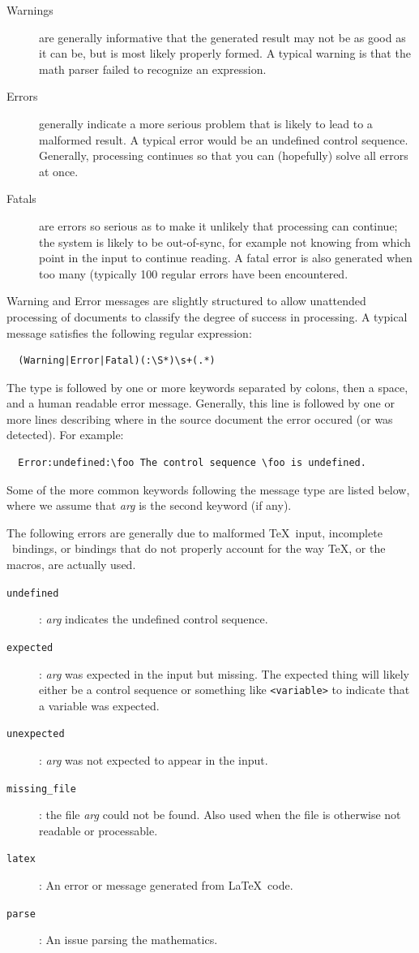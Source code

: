 \documentclass{book}
\begin{document}
\begin{description}
\item[Warnings] are generally
informative that the generated result may not be as good as it can be,
but is most likely properly formed.  A typical warning is that
the math parser failed to recognize an expression.
\item[Errors] generally indicate a more serious problem that is likely
to lead to a malformed result.  A typical error would be an undefined
control sequence.  Generally, processing continues so that you can
(hopefully) solve all errors at once.
\item[Fatals] are errors so serious as to make it unlikely that processing
can continue; the system is likely to be out-of-sync, for example
not knowing from which  point in the input to continue reading.
A fatal error is also generated when too many (typically 100 regular errors
have been encountered.
\end{description}

Warning and Error messages are slightly structured to allow
unattended processing of documents to classify the degree
of success in processing. A typical message satisfies the following regular expression:
\begin{verbatim}
  (Warning|Error|Fatal)(:\S*)\s+(.*)
\end{verbatim}
The type is followed by one or more keywords separated by colons,
then a space, and a human readable error message.
Generally, this line is followed by one or more lines describing
where in the source document the error occured (or was detected).
For example:
\begin{verbatim}
  Error:undefined:\foo The control sequence \foo is undefined.
\end{verbatim}

Some of the more common keywords following the message type are listed below,
where we assume that \textit{arg} is the second keyword (if any).

The following errors are generally due to malformed \TeX\ input, 
incomplete \LaTeXML\ bindings, or bindings that
do not properly account for the way \TeX, or the macros, are actually used.
\begin{description}
\item[\texttt{undefined}]: \textit{arg} indicates the undefined control sequence.
\item[\texttt{expected}]: \textit{arg} was expected in the input but missing.
 The expected thing will likely either be a control sequence or something like
 \verb|<variable>| to indicate that a variable was expected.
\item[\texttt{unexpected}]: \textit{arg} was not expected to appear in the input.
\item[\texttt{missing\_file}]: the file \textit{arg} could not be found.
  Also used when the file is otherwise not readable or processable.
\item[\texttt{latex}]: An error or message generated from \LaTeX\ code.
\item[\texttt{parse}]: An issue parsing the mathematics.
\end{description}
\end{document}
